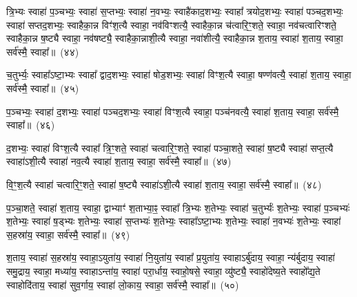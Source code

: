 {\anuvakamend[{द्वाभ्या॑म॒ष्टान॑वत्यै॒ षड्विꣳ॑शतिः}]}%

त्रि॒भ्यः स्वाहा॑ प॒ञ्चभ्यः॒ स्वाहा॑ स॒प्तभ्यः॒ स्वाहा॑ न॒वभ्यः॒ स्वाहै॑काद॒शभ्यः॒ स्वाहा᳚ त्रयोद॒शभ्यः॒ स्वाहा॑ पञ्चद॒शभ्यः॒ स्वाहा॑ सप्तद॒शभ्यः॒ स्वाहैका॒न्न विꣳ॑श॒त्यै स्वाहा॒ नव॑विꣳशत्यै॒ स्वाहैका॒न्न च॑त्वारि॒ꣳ॒शते॒ स्वाहा॒ नव॑चत्वारिꣳशते॒ स्वाहैका॒न्न ष॒ष्ट्यै स्वाहा॒ नव॑षष्ट्यै॒ स्वाहैका॒न्नाशी॒त्यै स्वाहा॒ नवा॑शीत्यै॒ स्वाहैका॒न्न श॒ताय॒ स्वाहा॑ श॒ताय॒ स्वाहा॒ सर्व॑स्मै॒ स्वाहा᳚॥~(४४)\ip

{\anuvakamend[{त्रि॒भ्यो᳚\-ऽष्टाचत्वारि॒ꣳ॒शत्}]}%

च॒तुर्भ्यः॒ स्वाहा᳚\-ऽष्टा॒भ्यः स्वाहा᳚ द्वाद॒शभ्यः॒ स्वाहा॑ षोड॒शभ्यः॒ स्वाहा॑ विꣳश॒त्यै स्वाहा॒ षण्ण॑वत्यै॒ स्वाहा॑ श॒ताय॒ स्वाहा॒ सर्व॑स्मै॒ स्वाहा᳚॥~(४५)\ip

{\anuvakamend[{च॒तुर्भ्यः॒ षण्ण॑वत्यै॒ षोड॑श}]}%

प॒ञ्चभ्यः॒ स्वाहा॑ द॒शभ्यः॒ स्वाहा॑ पञ्चद॒शभ्यः॒ स्वाहा॑ विꣳश॒त्यै स्वाहा॒ पञ्च॑नवत्यै॒ स्वाहा॑ श॒ताय॒ स्वाहा॒ सर्व॑स्मै॒ स्वाहा᳚॥~(४६)\ip

{\anuvakamend[{प॒ञ्चभ्यः॒ प़ञ्च॑नवत्यै॒ चतु॑र्दश}]}%

द॒शभ्यः॒ स्वाहा॑ विꣳश॒त्यै स्वाहा᳚ त्रि॒ꣳ॒शते॒ स्वाहा॑ चत्वारि॒ꣳ॒शते॒ स्वाहा॑ पञ्चा॒शते॒ स्वाहा॑ ष॒ष्ट्यै स्वाहा॑ सप्त॒त्यै स्वाहा॑\-ऽशी॒त्यै स्वाहा॑ नव॒त्यै स्वाहा॑ श॒ताय॒ स्वाहा॒ सर्व॑स्मै॒ स्वाहा᳚॥~(४७)\ip

{\anuvakamend[{द॒शभ्यो॒ द्वाविꣳ॑शतिः}]}%

वि॒ꣳ॒श॒त्यै स्वाहा॑ चत्वारि॒ꣳ॒शते॒ स्वाहा॑ ष॒ष्ट्यै स्वाहा॑\-ऽशी॒त्यै स्वाहा॑ श॒ताय॒ स्वाहा॒ सर्व॑स्मै॒ स्वाहा᳚॥~(४८)\ip

{\anuvakamend[{वि॒ꣳ॒श॒त्यै द्वाद॑श}]}%

प॒ञ्चा॒शते॒ स्वाहा॑ श॒ताय॒ स्वाहा॒ द्वाभ्याꣳ॑ श॒ताभ्या॒ꣴ॒ स्वाहा᳚ त्रि॒भ्यः श॒तेभ्यः॒ स्वाहा॑ च॒तुर्भ्यः॑ श॒तेभ्यः॒ स्वाहा॑ प॒ञ्चभ्यः॑ श॒तेभ्यः॒ स्वाहा॑ ष॒ड्भ्यः श॒तेभ्यः॒ स्वाहा॑ स॒प्तभ्यः॑ श॒तेभ्यः॒ स्वाहा᳚\-ऽष्टा॒भ्यः श॒तेभ्यः॒ स्वाहा॑ न॒वभ्यः॑ श॒तेभ्यः॒ स्वाहा॑ स॒हस्रा॑य॒ स्वाहा॒ सर्व॑स्मै॒ स्वाहा᳚॥~(४९)\ip

{\anuvakamend[{प॒ञ्चा॒शते॒ द्वात्रिꣳ॑शत्}]}%

श॒ताय॒ स्वाहा॑ स॒हस्रा॑य॒ स्वाहा॒\-ऽयुता॑य॒ स्वाहा॑ नि॒युता॑य॒ स्वाहा᳚ प्र॒युता॑य॒ स्वाहा\-ऽर्बु॑दाय॒ स्वाहा॒ न्य॑र्बुदाय॒ स्वाहा॑ समु॒द्राय॒ स्वाहा॒ मध्या॑य॒ स्वाहा\-ऽन्ता॑य॒ स्वाहा॑ परा॒र्धाय॒ स्वाहो॒षसे॒ स्वाहा॒ व्यु॑ष्ट्यै॒ स्वाहो॑देष्य॒ते स्वाहो᳚द्य॒ते स्वाहोदि॑ताय॒ स्वाहा॑ सुव॒र्गाय॒ स्वाहा॑ लो॒काय॒ स्वाहा॒ सर्व॑स्मै॒ स्वाहा᳚॥~(५०)\ip

